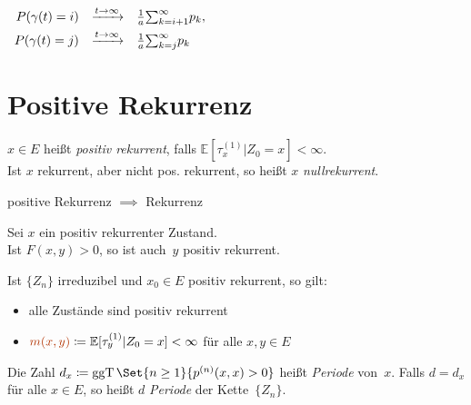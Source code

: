 \documentclass{cheat-sheet}
\newcommand{\E}{\mathbb{E}} %
\DeclareMathOperator{\ggT}{ggT} %
\newcommand{\Defn}[1]{\textcolor{DefinitionColor}{#1}}
\begin{document}
\begin{kor}
  $
    \begin{array}[t]{r c l}
      P(\gamma(t) = i) &\xrightarrow{t \to \infty}& \tfrac{1}{a} {\sum}_{k=i+1}^\infty p_k, \\[0.15cm]
      P(\gamma(t) = j) &\xrightarrow{t \to \infty}& \tfrac{1}{a} {\sum}_{k=j}^\infty p_k
    \end{array}
  $
\end{kor}



\section{Positive Rekurrenz}

\begin{defn}
  $x \in E$ heißt \emph{positiv rekurrent}, falls $\E [\tau_x^{(1)} | Z_0=x] < \infty$. \\
  Ist $x$ rekurrent, aber nicht pos. rekurrent, so heißt $x$ \emph{nullrekurrent}.
\end{defn}

\begin{bem}
  positive Rekurrenz $\implies$ Rekurrenz
\end{bem}

\begin{lem}
  \begin{minipage}[t]{0.8 \linewidth}
    Sei $x$ ein positiv rekurrenter Zustand. \\
    Ist $F(x, y) > 0$, so ist auch~$y$ positiv rekurrent.
  \end{minipage}
\end{lem}

\begin{kor}
  Ist $\{ Z_n \}$ irreduzibel und $x_0 \in E$ positiv rekurrent, so gilt:
  \begin{itemize}
    \item alle Zustände sind positiv rekurrent
    \item $\Defn{m(x, y)} \coloneqq \E[ \tau^{(1)}_y | Z_0 = x ] < \infty$ für alle $x, y \in E$
  \end{itemize}
\end{kor}

\begin{defn}
  Die Zahl
  $d_x \coloneqq \ggT \Set{n \geq 1}{p^{(n)}(x,x) > 0}$
  heißt \emph{Periode} von~$x$.
  Falls $d = d_x$ für alle $x \in E$, so heißt $d$ \textit{Periode} der Kette~$\{ Z_n \}$.
\end{defn}
\end{document}

